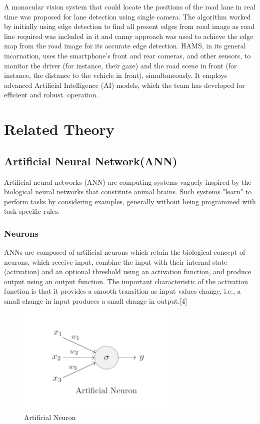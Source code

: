 A monocular vision system that could locate the positions of the road lane in real time was proposed for lane detection using single camera. The algorithm worked by initially using edge detection to find all present edges from road image as road line required was included in it and canny approach was used to achieve the edge map from the road image for its accurate edge detection. \cite{improvedcannyedge}
HAMS, in its general incarnation, uses the smartphone’s front and rear cameras, and other sensors, to monitor the driver (for instance, their gaze) and the road scene in front (for instance, the distance to the vehicle in front), simultaneously. It employs advanced Artificial Intelligence (AI) models, which the team has developed for efficient and robust. operation\cite{bordia2020automated}.
 


   


\section{Related Theory}
\subsection{Artificial Neural Network(ANN)}
Artificial neural networks (ANN) are computing systems vaguely inspired by the biological neural networks that constitute animal brains. Such systems "learn" to perform tasks by considering examples, generally without being programmed with
task-specific rules\cite{bordia2020automated}.

\subsubsection{Neurons}
ANNs are composed of artificial neurons which retain the biological concept of
neurons, which receive input, combine the input with their internal state
(activation) and an optional threshold using an activation function, and produce
output using an output function. The important characteristic of the activation
function is that it provides a smooth transition as input values change, i.e., a small change in input produces a small change in output.[4]

\begin{figure}[tbh] %
\begin{center}
	\includegraphics[width = 3in]{images/artificialneuron.png}
	\caption{Artificial Neuron} %
	\label{figArtificialNeuron} %
\end{center}
\end{figure}

